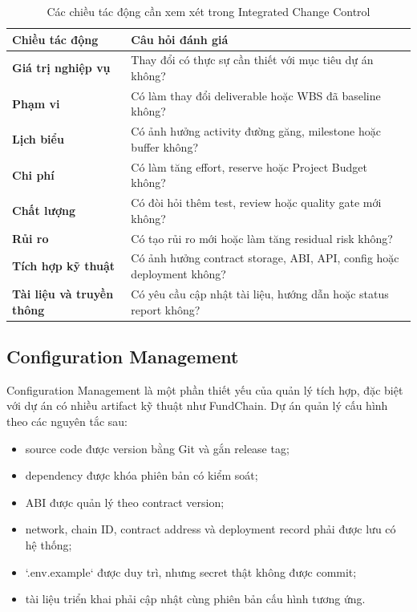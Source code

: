 \begin{table}[H]
\centering
\caption{Các chiều tác động cần xem xét trong Integrated Change Control}
\label{tab:change-impact-dimensions}
\begin{tabularx}{\textwidth}{| >{\bfseries}p{4cm} | X |}
\hline
Chiều tác động & Câu hỏi đánh giá \\
\hline
Giá trị nghiệp vụ & Thay đổi có thực sự cần thiết với mục tiêu dự án không? \\ \hline
Phạm vi & Có làm thay đổi deliverable hoặc WBS đã baseline không? \\ \hline
Lịch biểu & Có ảnh hưởng activity đường găng, milestone hoặc buffer không? \\ \hline
Chi phí & Có làm tăng effort, reserve hoặc Project Budget không? \\ \hline
Chất lượng & Có đòi hỏi thêm test, review hoặc quality gate mới không? \\ \hline
Rủi ro & Có tạo rủi ro mới hoặc làm tăng residual risk không? \\ \hline
Tích hợp kỹ thuật & Có ảnh hưởng contract storage, ABI, API, config hoặc deployment không? \\ \hline
Tài liệu và truyền thông & Có yêu cầu cập nhật tài liệu, hướng dẫn hoặc status report không? \\
\hline
\end{tabularx}
\end{table}

\subsection{Configuration Management}

Configuration Management là một phần thiết yếu của quản lý tích hợp, đặc biệt với dự án có nhiều artifact kỹ thuật như FundChain. Dự án quản lý cấu hình theo các nguyên tắc sau:

\begin{itemize}
  \item source code được version bằng Git và gắn release tag;
  \item dependency được khóa phiên bản có kiểm soát;
  \item ABI được quản lý theo contract version;
  \item network, chain ID, contract address và deployment record phải được lưu có hệ thống;
  \item `.env.example` được duy trì, nhưng secret thật không được commit;
  \item tài liệu triển khai phải cập nhật cùng phiên bản cấu hình tương ứng.
\end{itemize}

